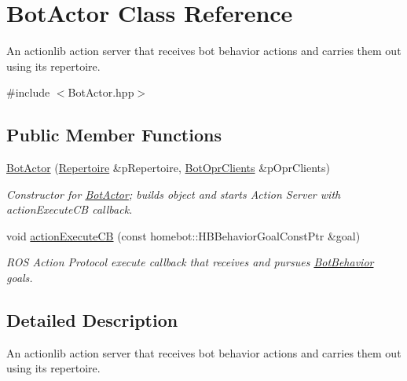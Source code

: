 \hypertarget{classBotActor}{\section{Bot\-Actor Class Reference}
\label{classBotActor}
}


An actionlib action server that receives bot behavior actions and carries them out using its repertoire.  




{\ttfamily \#include $<$Bot\-Actor.\-hpp$>$}

\subsection*{Public Member Functions}
\begin{DoxyCompactItemize}
\item 
\hyperlink{classBotActor_a4eeb9f0ee88968768d7bb9ff5355b2dd}{Bot\-Actor} (\hyperlink{classRepertoire}{Repertoire} \&p\-Repertoire, \hyperlink{classBotOprClients}{Bot\-Opr\-Clients} \&p\-Opr\-Clients)
\begin{DoxyCompactList}\small\item\em Constructor for \hyperlink{classBotActor}{Bot\-Actor}; builds object and starts Action Server with action\-Execute\-C\-B callback. \end{DoxyCompactList}\item 
void \hyperlink{classBotActor_af0bcbb0676bc52bb16e1274c7398bf09}{action\-Execute\-C\-B} (const homebot\-::\-H\-B\-Behavior\-Goal\-Const\-Ptr \&goal)
\begin{DoxyCompactList}\small\item\em R\-O\-S Action Protocol execute callback that receives and pursues \hyperlink{classBotBehavior}{Bot\-Behavior} goals. \end{DoxyCompactList}\end{DoxyCompactItemize}


\subsection{Detailed Description}
An actionlib action server that receives bot behavior actions and carries them out using its repertoire. 

